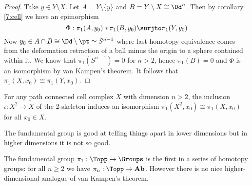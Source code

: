 \begin{proof}
	Take $y \in Y \setminus X$.
	Let $A = Y \setminus \{y\}$ and $B = Y \setminus X \cong \Dd^n$.
	Then by corollary \ref{7:cell} we have an epimorphism
	\[\Phi: \pi_1(A,y_0) * \pi_1(B,y_0) \surjto \pi_1(Y,y_0)\]
	Now $y_0 \in A \cap B \cong \Dd \setminus \pt \simeq S^{n-1}$ where last homotopy equivalence comes from the deformation retraction of a ball minus the origin to a sphere contained within it.
	We know that $\pi_1(S^{n-1})=0$ for $n>2$, hence $\pi_1(B)=0$ and $\Phi$ is an isomorphism by van Kampen's theorem.
	It follows that $\pi_1(X,x_0) \cong \pi_1(Y,x_0)$.
\end{proof}

\begin{cor}
	For any path connected cell complex $X$ with dimension $n>2$, the inclusion $\iota: X^2 \to X$ of the 2-skeleton induces an isomorphism $\pi_1(X^2,x_0) \cong \pi_1(X,x_0)$ for all $x_0 \in X$.
\end{cor}

\begin{rmk}
	The fundamental group is good at telling things apart in lower dimensions but in higher dimensions it is not so good.
\end{rmk}

\begin{rmk}
	The fundamental group $\pi_1: \Topp \to \Groups$ is the first in a series of homotopy groups: for all $n \geq 2$ we have $\pi_n: \Topp \to \mathbf{Ab}$.
	However there is no nice higher-dimensional analogue of van Kampen's theorem.
\end{rmk}
